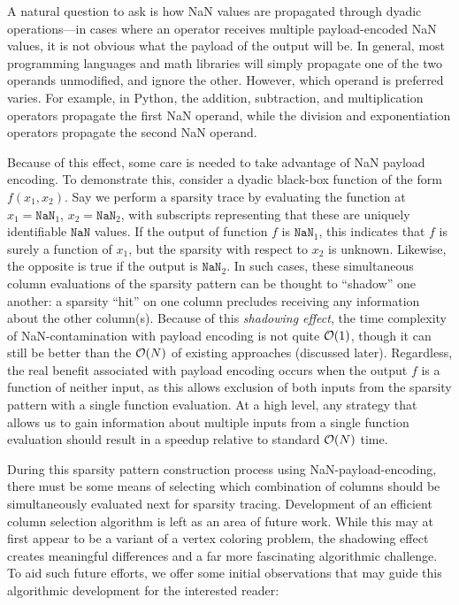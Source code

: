 A natural question to ask is how NaN values are propagated through dyadic operations—in cases where an operator receives multiple payload-encoded NaN values, it is not obvious what the payload of the output will be. In general, most programming languages and math libraries will simply propagate one of the two operands unmodified, and ignore the other. However, which operand is preferred varies. For example, in Python, the addition, subtraction, and multiplication operators propagate the first NaN operand, while the division and exponentiation operators propagate the second NaN operand.

Because of this effect, some care is needed to take advantage of NaN payload encoding. To demonstrate this, consider a dyadic black-box function of the form $f(x_1, x_2)$. Say we perform a sparsity trace by evaluating the function at $x_1=\texttt{NaN}_1$, $x_2=\texttt{NaN}_2$, with subscripts representing that these are uniquely identifiable $\texttt{NaN}$ values. If the output of function $f$ is $\texttt{NaN}_1$, this indicates that $f$ is surely a function of $x_1$, but the sparsity with respect to $x_2$ is unknown. Likewise, the opposite is true if the output is $\texttt{NaN}_2$. In such cases, these simultaneous column evaluations of the sparsity pattern can be thought to ``shadow'' one another: a sparsity ``hit'' on one column precludes receiving any information about the other column(s). Because of this \emph{shadowing effect}, the time complexity of NaN-contamination with payload encoding is not quite $\mathcal{O}(1)$, though it can still be better than the $\mathcal{O}(N)$ of existing approaches (discussed later). Regardless, the real benefit associated with payload encoding occurs when the output $f$ is a function of neither input, as this allows exclusion of both inputs from the sparsity pattern with a single function evaluation. At a high level, any strategy that allows us to gain information about multiple inputs from a single function evaluation should result in a speedup relative to standard $\mathcal{O}(N)$ time.

During this sparsity pattern construction process using NaN-payload-encoding, there must be some means of selecting which combination of columns should be simultaneously evaluated next for sparsity tracing. Development of an efficient column selection algorithm is left as an area of future work. While this may at first appear to be a variant of a vertex coloring problem, the shadowing effect creates meaningful differences and a far more fascinating algorithmic challenge. To aid such future efforts, we offer some initial observations that may guide this algorithmic development for the interested reader:

